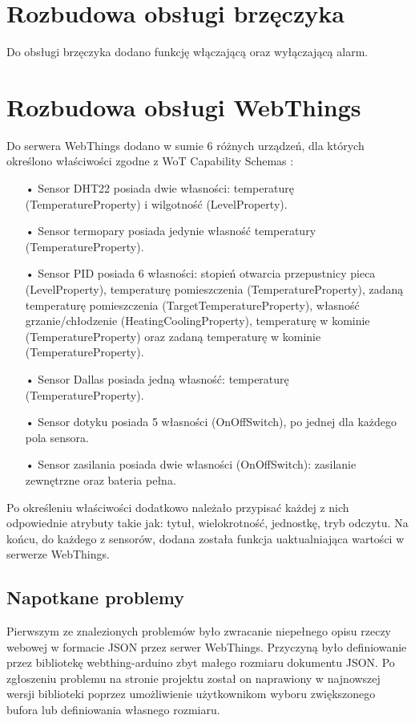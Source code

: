 \documentclass[11pt]{report}
\begin{document}
 \section{Rozbudowa obsługi brzęczyka}
 Do obsługi brzęczyka dodano funkcję włączającą oraz wyłączającą alarm.
 
 \section{Rozbudowa obsługi WebThings}
 Do serwera WebThings dodano w sumie 6 różnych urządzeń, dla których określono właściwości zgodne z  WoT Capability Schemas \cite{wotschemas2020}:
 \begin{enumerate}
 \item[•] Sensor DHT22 posiada dwie własności: temperaturę (TemperatureProperty) i wilgotność (LevelProperty).
 \item[•] Sensor termopary posiada jedynie własność temperatury (TemperatureProperty).
 \item[•] Sensor PID posiada 6 własności: stopień otwarcia przepustnicy pieca (LevelProperty), temperaturę pomieszczenia (TemperatureProperty), zadaną temperaturę pomieszczenia (TargetTemperatureProperty), własność grzanie/chłodzenie (HeatingCoolingProperty), temperaturę w kominie (TemperatureProperty) oraz zadaną temperaturę w kominie (TemperatureProperty).
 \item[•] Sensor Dallas posiada jedną własność: temperaturę (TemperatureProperty).
 \item[•] Sensor dotyku posiada 5 własności (OnOffSwitch), po jednej dla każdego pola sensora.
 \item[•] Sensor zasilania posiada dwie własności (OnOffSwitch): zasilanie zewnętrzne oraz bateria pełna.
 \end{enumerate}
 Po określeniu właściwości dodatkowo należało przypisać każdej z nich odpowiednie atrybuty takie jak: tytuł, wielokrotność, jednostkę, tryb odczytu.
 Na końcu, do każdego z sensorów, dodana została funkcja uaktualniająca wartości w serwerze WebThings.
 \subsection{Napotkane problemy}
 Pierwszym ze znalezionych problemów było zwracanie niepełnego opisu rzeczy webowej w formacie JSON przez serwer WebThings. Przyczyną było definiowanie przez bibliotekę webthing-arduino zbyt małego rozmiaru dokumentu JSON. Po zgłoszeniu problemu na stronie projektu został on naprawiony w najnowszej wersji biblioteki poprzez umożliwienie użytkownikom wyboru zwiększonego bufora lub definiowania własnego rozmiaru.
 
\end{document}
